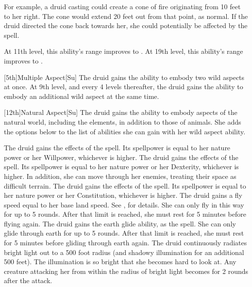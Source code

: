         For example, a druid casting  could create a cone of fire originating from 10 feet to her right.
        The cone would extend 20 feet out from that point, as normal.
        If the druid directed the cone back towards her, she could potentially be affected by the spell.

        At 11th level, this ability's range improves to \rngclose.
        At 19th level, this ability's range improves to \rngmed.

        [5th]{Multiple Aspect}[Su]
        The druid gains the ability to embody two wild aspects at once.
        At 9th level, and every 4 levels thereafter, the druid gains the ability to embody an additional wild aspect at the same time.

        [12th]{Natural Aspect}[Su]
        The druid gains the ability to embody aspects of the natural world, including the elements, in addition to those of animals.
        She adds the options below to the list of abilities she can gain with her wild aspect ability.

         The druid gains the effects of the  spell.
        Its spellpower is equal to her nature power or her Willpower, whichever is higher.
         The druid gains the effects of the  spell.
        Its spellpower is equal to her nature power or her Dexterity, whichever is higher.
        In addition, she can move through her enemies, treating their space as difficult terrain.
         The druid gains the effects of the  spell.
        Its spellpower is equal to her nature power or her Constitution, whichever is higher.
         The druid gains a fly speed equal to her base land speed.
        See , for details.
        She can only fly in this way for up to 5 rounds.
        After that limit is reached, she must rest for 5 minutes before flying again.
        The druid gains the earth glide ability, as the  spell.
        She can only glide through earth for up to 5 rounds.
        After that limit is reached, she must rest for 5 minutes before gliding through earth again.
        The druid continuously radiates bright light out to a 500 foot radius (and shadowy illumination for an additional 500 feet).
        The illumination is so bright that she becomes hard to look at.
        Any creature attacking her from within the radius of bright light becomes \partiallyblinded for 2 rounds after the attack.

